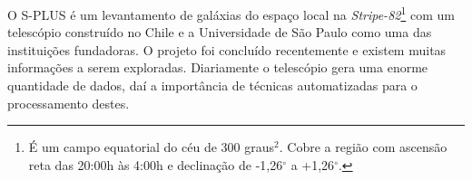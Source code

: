 O S-PLUS \cite{oliveira2019} é um levantamento de galáxias do espaço local na \emph{Stripe-82}\footnote{É um campo equatorial do céu de 300 graus$^{2}$. Cobre a região com ascensão reta das 20:00h às 4:00h e declinação de -1,26$^{\circ}$ a +1,26$^{\circ}$.} com um telescópio construído no Chile e a Universidade de São Paulo como uma das instituições fundadoras. O projeto foi concluído recentemente e existem muitas informações a serem exploradas. Diariamente o telescópio gera uma enorme quantidade de dados, daí a importância de técnicas automatizadas para o processamento destes.

